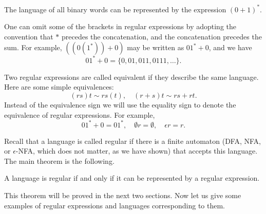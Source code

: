 \begin{page}

\begin{exl}
The language of all binary words can be represented by the expression $(0+1)^*$.
\end{exl}

\end{page}

\begin{page}



One can omit some of the brackets in regular expressions by adopting the convention that $*$ precedes the concatenation, and the concatenation precedes the sum.
For example, $((0(1^*))+0)$ may be written as $01^* + 0$, and we have
\[
01^* + 0 = \{0, 01, 011, 0111, \ldots\}.
\]

Two regular expressions are called equivalent if they describe the same language.
Here are some simple equivalences:
\[
(rs)t \sim rs(t), \quad (r+s)t \sim rs + rt.
\]
Instead of the equivalence sign we will use the equality sign to denote the equivalence of regular expressions.
For example,
\[
01^* + 0 = 01^*, \quad \emptyset r = \emptyset, \quad \epsilon r = r.
\]




Recall that a language is called regular if there is a finite automaton (DFA, NFA, or $\epsilon$-NFA, which does not matter, as we have shown)
that accepts this language.
The main theorem is the following.

\end{page}

\begin{page}

\begin{thm}
\label{thm:RegLangExpr}
A language is regular if and only if it can be represented by a regular expression.
\end{thm}

\end{page}

\begin{page}


This theorem will be proved in the next two sections.
Now let us give some examples of regular expressions and languages corresponding to them.


\end{page}

